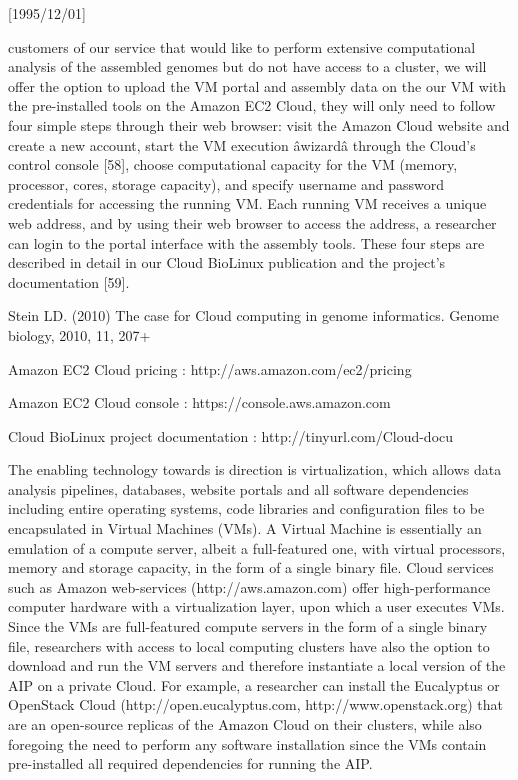 \NeedsTeXFormat{LaTeX2e}[1995/12/01] \documentclass[10pt]{bmc_article}
\newenvironment{bmcformat}{\begin{raggedright}\baselineskip20pt\sloppy\setboolean{publ}{false}}{\end{raggedright}\baselineskip20pt\sloppy}
\begin{document}
\begin{bmcformat}
customers of our service that would like to perform extensive computational analysis of the assembled genomes
but do not have access to a cluster, we will offer the option to upload the VM portal and assembly data on the
our VM with the pre-installed tools on the Amazon EC2 Cloud, they will only need to follow four simple steps
through their web browser: visit the Amazon Cloud website and create a new account, start the VM execution
âwizardâ through the Cloud's control console [58], choose computational capacity for the VM (memory,
processor, cores, storage capacity), and specify username and password credentials for accessing the running
VM. Each running VM receives a unique web address, and by using their web browser to access the address, a
researcher can login to the portal interface with the assembly tools. These four steps are described in detail
in our Cloud BioLinux publication and the project's documentation [59].

Stein LD. (2010) The case for Cloud computing in genome informatics. Genome biology, 2010, 11, 207+ 

Amazon EC2 Cloud pricing : http://aws.amazon.com/ec2/pricing  

Amazon EC2 Cloud console : https://console.aws.amazon.com 

Cloud BioLinux project documentation : http://tinyurl.com/Cloud-docu


The enabling technology towards is direction is virtualization, which allows data analysis pipelines,
databases, website portals and all software dependencies including entire operating systems, code libraries
and configuration files to be encapsulated in Virtual Machines (VMs). A Virtual Machine is essentially an
emulation of a compute server, albeit a full-featured one, with virtual processors, memory and storage
capacity, in the form of a single binary file. Cloud services such as Amazon web-services
(http://aws.amazon.com) offer high-performance computer hardware with a virtualization layer, upon which a
user executes VMs.  Since the VMs are full-featured compute servers  in the form of a single binary file,
researchers with access to local computing clusters have also the option to download and run the VM servers
and therefore instantiate a local version of the AIP on a private Cloud. For example, a researcher can install
the Eucalyptus or OpenStack Cloud (http://open.eucalyptus.com, http://www.openstack.org) that are an
open-source replicas of the Amazon Cloud on their clusters, while also foregoing the need to perform any
software installation since the VMs contain pre-installed all required dependencies for running the AIP.


\end{bmcformat}
\end{document}
